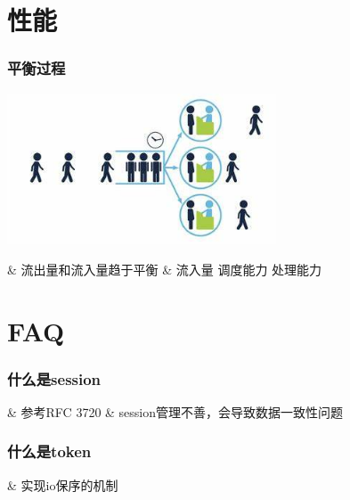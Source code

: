 \documentclass[UTF8,8pt,xcolor=dvipsnames]{beamer}
\newenvironment{myeasylist}[1]{
    \Activate
    \begin{tcolorbox}
    \begin{easylist}[#1]
} {
    \end{easylist}
    \end{tcolorbox}
    \Deactivate
}
\begin{document}
\section{性能}

\begin{frame}[fragile]
    \frametitle{平衡过程}
    \begin{center}
        \includegraphics[width=0.6\textwidth]{../imgs/queuing.jpeg}
    \end{center}

    \begin{myeasylist}{itemize}
        & 流出量和流入量趋于平衡
        & 流入量  调度能力  处理能力
    \end{myeasylist}
\end{frame}

\section{FAQ}


\begin{frame}[fragile]
    \frametitle{什么是session}

    \begin{myeasylist}{itemize}
        & 参考RFC 3720
        & session管理不善，会导致数据一致性问题
    \end{myeasylist}
\end{frame}


\begin{frame}[fragile]
    \frametitle{什么是token}

    \begin{myeasylist}{itemize}
        & 实现io保序的机制
    \end{myeasylist}
\end{frame}
\end{document}
